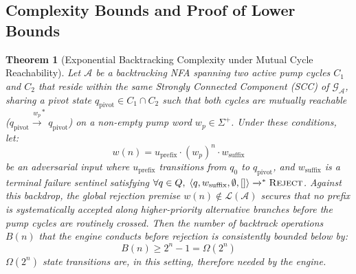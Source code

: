 \documentclass{ieeeaccess}
\newtheorem{theorem}{Theorem}
\begin{document}
\subsection{Complexity Bounds and Proof of Lower Bounds}

\begin{theorem}[Exponential Backtracking Complexity under Mutual Cycle Reachability]\label{thm:exp_lower_bound}
Let $\mathcal{A}$ be a backtracking NFA spanning two active pump cycles $C_1$ and $C_2$ that reside within the same Strongly Connected Component (SCC) of $\mathcal{G}_{\mathcal{A}}$, sharing a pivot state $q_{\mathrm{pivot}} \in C_1 \cap C_2$ such that both cycles are mutually reachable ($q_{\mathrm{pivot}} \xrightarrow{w_p}^* q_{\mathrm{pivot}}$) on a non-empty pump word $w_p \in \Sigma^+$. Under these conditions, let:
\begin{equation}\label{eq:adv_payload}
w(n) = u_{\mathrm{prefix}} \cdot (w_p)^n \cdot w_{\mathrm{suffix}}
\end{equation}
be an adversarial input where $u_{\mathrm{prefix}}$ transitions from $q_0$ to $q_{\mathrm{pivot}}$, and $w_{\mathrm{suffix}}$ is a terminal failure sentinel satisfying $\forall q \in Q, \; \langle q, w_{\mathrm{suffix}}, \emptyset, [] \rangle \xrightarrow{}^* \textsc{Reject}$. Against this backdrop, the global rejection premise $w(n) \notin \mathcal{L}(\mathcal{A})$ secures that no prefix is systematically accepted along higher-priority alternative branches before the pump cycles are routinely crossed. Then the number of backtrack operations $B(n)$ that the engine conducts before rejection is consistently bounded below by:
\begin{equation}\label{eq:exp_lower_bound}
B(n) \ge 2^n - 1 = \Omega(2^n)
\end{equation}
$\Omega(2^n)$ state transitions are, in this setting, therefore needed by the engine.
\end{theorem}
\end{document}
